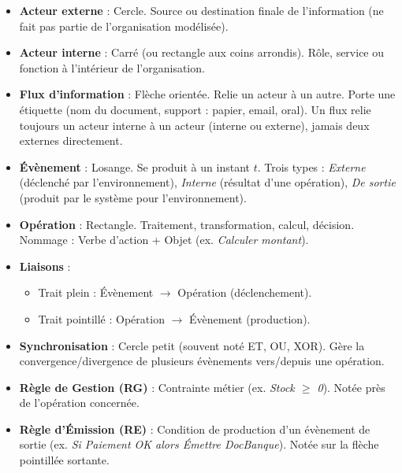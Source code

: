 \documentclass[11pt]{article}
\newcounter{popsec}
\newcounter{popsub}
\newcommand{\courssub}[1]{%
  \stepcounter{popsub}%
  \par\vspace{9pt}\noindent{\popxbold\fontsize{11.5}{13}\selectfont\color{popink}{\color{poporange}\thepopsec.\thepopsub}\hspace{6pt}#1}\par\nopagebreak\vspace{4pt}
}
\begin{document}
\courssub{Ressources à mobiliser}
\begin{propriete}
\begin{itemize}
    \item \textbf{Acteur externe} : Cercle. Source ou destination finale de l'information (ne fait pas partie de l'organisation modélisée).
    \item \textbf{Acteur interne} : Carré (ou rectangle aux coins arrondis). Rôle, service ou fonction à l'intérieur de l'organisation.
    \item \textbf{Flux d'information} : Flèche orientée. Relie un acteur à un autre. Porte une étiquette (nom du document, support : papier, email, oral). Un flux relie toujours un acteur interne à un acteur (interne ou externe), jamais deux externes directement.
\end{itemize}
\end{propriete}

\begin{propriete}
\begin{itemize}
    \item \textbf{Évènement} : Losange. Se produit à un instant $t$. Trois types : \emph{Externe} (déclenché par l'environnement), \emph{Interne} (résultat d'une opération), \emph{De sortie} (produit par le système pour l'environnement).
    \item \textbf{Opération} : Rectangle. Traitement, transformation, calcul, décision. Nommage : Verbe d'action + Objet (ex. \emph{Calculer montant}).
    \item \textbf{Liaisons} :
        \begin{itemize}
            \item Trait plein : Évènement $\to$ Opération (déclenchement).
            \item Trait pointillé : Opération $\to$ Évènement (production).
        \end{itemize}
    \item \textbf{Synchronisation} : Cercle petit (souvent noté ET, OU, XOR). Gère la convergence/divergence de plusieurs évènements vers/depuis une opération.
    \item \textbf{Règle de Gestion (RG)} : Contrainte métier (ex. \emph{Stock $\ge$ 0}). Notée près de l'opération concernée.
    \item \textbf{Règle d'Émission (RE)} : Condition de production d'un évènement de sortie (ex. \emph{Si Paiement OK alors Émettre DocBanque}). Notée sur la flèche pointillée sortante.
\end{itemize}
\end{propriete}
\end{document}
